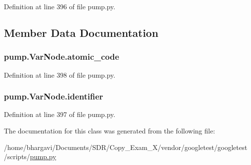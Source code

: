 Definition at line 396 of file pump.\+py.



\subsection{Member Data Documentation}
\subsubsection[{\texorpdfstring{atomic\+\_\+code}{atomic_code}}]{\setlength{\rightskip}{0pt plus 5cm}pump.\+Var\+Node.\+atomic\+\_\+code}\hypertarget{classpump_1_1_var_node_ad6bef6a8577b994fbe9ccddf3c82d2fc}{}\label{classpump_1_1_var_node_ad6bef6a8577b994fbe9ccddf3c82d2fc}


Definition at line 398 of file pump.\+py.

\subsubsection[{\texorpdfstring{identifier}{identifier}}]{\setlength{\rightskip}{0pt plus 5cm}pump.\+Var\+Node.\+identifier}\hypertarget{classpump_1_1_var_node_aa2b634e2443646c3754f2d193efa4dc7}{}\label{classpump_1_1_var_node_aa2b634e2443646c3754f2d193efa4dc7}


Definition at line 397 of file pump.\+py.



The documentation for this class was generated from the following file\+:\begin{DoxyCompactItemize}
\item 
/home/bhargavi/\+Documents/\+S\+D\+R/\+Copy\+\_\+\+Exam\+\_\+X/vendor/googletest/googletest/scripts/\hyperlink{pump_8py}{pump.\+py}\end{DoxyCompactItemize}
